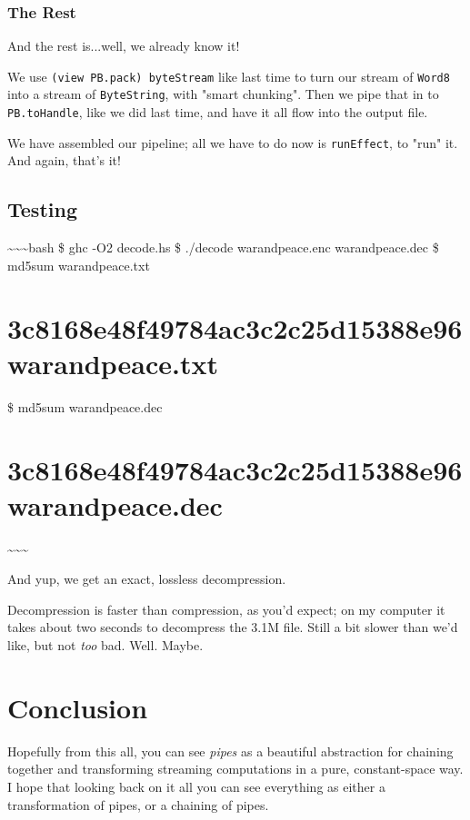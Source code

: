 \documentclass[]{article}
\begin{document}
\subsubsection{The Rest}

And the rest is...well, we already know it!

We use \texttt{(view\ PB.pack)\ byteStream} like last time to turn our stream of
\texttt{Word8} into a stream of \texttt{ByteString}, with "smart chunking". Then
we pipe that in to \texttt{PB.toHandle}, like we did last time, and have it all
flow into the output file.

We have assembled our pipeline; all we have to do now is \texttt{runEffect}, to
"run" it. And again, that's it!

\subsection{Testing}

\textasciitilde{}\textasciitilde{}\textasciitilde{}bash \$ ghc -O2 decode.hs \$
./decode warandpeace.enc warandpeace.dec \$ md5sum warandpeace.txt

\section{3c8168e48f49784ac3c2c25d15388e96 warandpeace.txt}

\$ md5sum warandpeace.dec

\section{3c8168e48f49784ac3c2c25d15388e96 warandpeace.dec}

\textasciitilde{}\textasciitilde{}\textasciitilde{}

And yup, we get an exact, lossless decompression.

Decompression is faster than compression, as you'd expect; on my computer it
takes about two seconds to decompress the 3.1M file. Still a bit slower than
we'd like, but not \emph{too} bad. Well. Maybe.

\section{Conclusion}

Hopefully from this all, you can see \emph{pipes} as a beautiful abstraction for
chaining together and transforming streaming computations in a pure,
constant-space way. I hope that looking back on it all you can see everything as
either a transformation of pipes, or a chaining of pipes.
\end{document}

